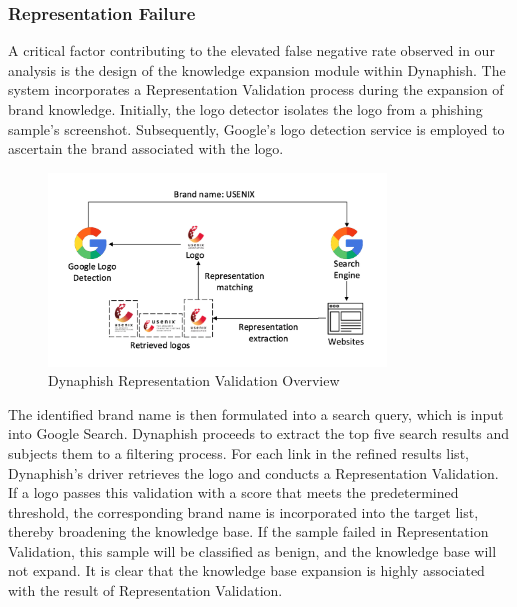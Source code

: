 \subsubsection{Representation Failure}

A critical factor contributing to the elevated false negative rate observed in our analysis is the design of the knowledge expansion module within Dynaphish. The system incorporates a Representation Validation process during the expansion of brand knowledge. Initially, the logo detector isolates the logo from a phishing sample's screenshot. Subsequently, Google's logo detection service is employed to ascertain the brand associated with the logo. 


\begin{figure}[H]
\caption{Dynaphish Representation Validation Overview \cite{liu2023knowledge}}
\centering
\includegraphics[width=0.8\textwidth]{images/knowledge_expansion.png}
\end{figure}


The identified brand name is then formulated into a search query, which is input into Google Search. Dynaphish proceeds to extract the top five search results and subjects them to a filtering process. For each link in the refined results list, Dynaphish's driver retrieves the logo and conducts a Representation Validation. If a logo passes this validation with a score that meets the predetermined threshold, the corresponding brand name is incorporated into the target list, thereby broadening the knowledge base. If the sample failed in Representation Validation, this sample will be classified as benign, and the knowledge base will not expand. It is clear that the knowledge base expansion is highly associated with the result of Representation Validation. 

